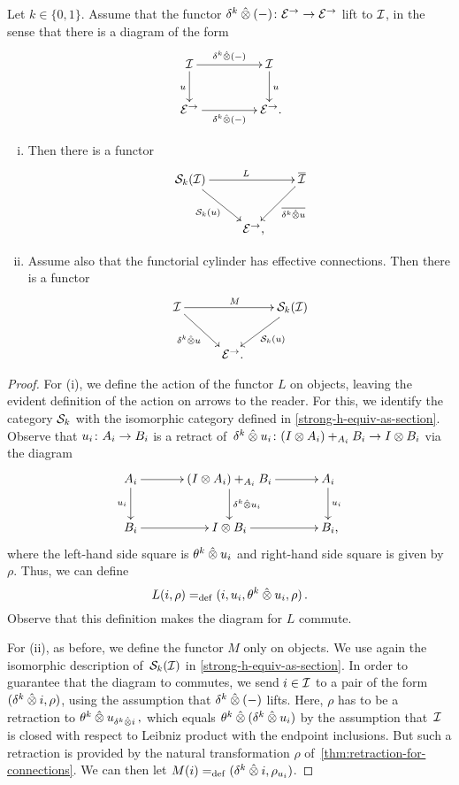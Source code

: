 \documentclass[reqno,10pt,a4paper,oneside]{amsart}
\begin{document}
\begin{lemma} \label{thm:she-to-retract-closure} Let $k \in \{0 , 1\}$.
Assume that the functor $\kcyl \hatotimes (-) \co \catE^\to \to \catE^\to$ lift to $\cal{I}$, in the sense that there is a diagram of the form
\[
\xymatrix@C+2em{
  \cal{I}  \ar[d]_u \ar[r]^{\kcyl \hatotimes (-)} & \cal{I} \ar[d]^{u} \\
  \cal{E}^\to \ar[r]_{\kcyl \hatotimes (-)} & \cal{E}^\to \rlap{.} }
\]
\begin{enumerate}[(i)]
\item Then there is a functor
\[
\xycenter{
  \cal{S}_k(\cal{I}) \ar[dr]_{\cal{S}_k(u)} \ar[rr]^L & & \overline{\cal{I}} \ar[dl]^-{\overline{\kcyl \hatotimes u}} \\
  & \catE^\to \rlap{,} &
}
\]
\item Assume also that the functorial cylinder has effective connections.
Then there is a functor
\[
\xycenter{
 \cal{I} \ar[dr]_{\kcyl \hatotimes u} \ar[rr]^M & & \cal{S}_k(\cal{I}) \ar[dl]^{\cal{S}_k(u)} \\
 & \ \catE^\to \rlap{.}  &
}
\]
\end{enumerate}
\end{lemma}

\begin{proof}
For (i), we define the action of the functor $L$ on objects, leaving the evident definition of the action on arrows to the reader.
For this, we identify the category $\cal{S}_k$ with the isomorphic category defined in \cref{strong-h-equiv-as-section}.
Observe that $u_i \co A_i \to B_i$ is a retract of~$\kcyl \hatotimes u_i \co (\interval \otimes A_i) +_{A_i} B_i \to \interval \otimes B_i$ via the diagram
\[
\xymatrix@C+1em{
  A_i \ar[d]_{u_i} \ar[r] & (\interval \otimes A_i) +_{A_i} B_i \ar[r] \ar[d]^{\kcyl \hatotimes u_i } & A_i \ar[d]^{u_i} \\
  B_i \ar[r] & \interval \otimes B_i \ar[r] & B_i \rlap{,}}
\]
where the left-hand side square is $\thetak \hatotimes u_i$ and right-hand side square is given by $\rho$.
Thus, we can define
\[
  L(i, \rho) \defeq (i, u_i, \thetak \hatotimes u_i, \rho)
\, .\]
Observe that this definition makes the diagram for $L$ commute.

For (ii), as before, we define the functor $M$ only on objects.
We use again the isomorphic description of~$\cal{S}_k(\cal{I})$ in \cref{strong-h-equiv-as-section}.
In order to guarantee that the diagram to commutes, we send $i \in \cal{I}$ to a pair of the form $(\kcyl \hatotimes i, \rho)$, using the assumption that $\kcyl \hatotimes (-)$ lifts.
Here, $\rho$ has to be a retraction to $\thetak \hatotimes u_{\kcyl \hatotimes i}\, ,$ which equals $\thetak \hatotimes (\kcyl \hatotimes u_i)$ by the assumption that~$\cal{I}$ is closed with respect to Leibniz product with the endpoint inclusions.
But such a retraction is provided by the natural transformation $\rho$ of~\cref{thm:retraction-for-connections}.
We can then let $M(i) \defeq (\kcyl \hatotimes i, \rho_{u_i})$.
\end{proof}
\end{document}
